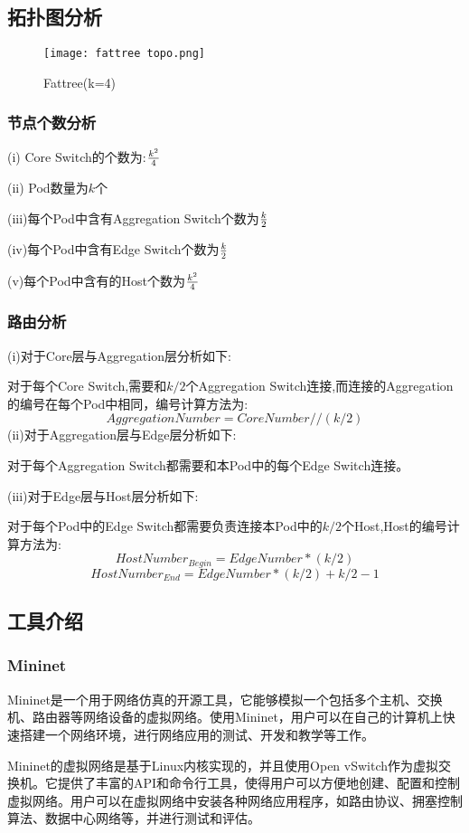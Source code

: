 \documentclass{xjtureport}
\begin{document}
\subsection{拓扑图分析} 
\begin{figure}[H]
	\centering
	\texttt{[image: fattree topo.png]}
	\caption{Fattree(k=4)}
\end{figure}
\subsubsection{节点个数分析}
(i) Core Switch的个数为:$k^2 \over 4$\par
(ii) Pod数量为$k$个\par
(iii)每个Pod中含有Aggregation Switch个数为$k \over 2$\par
(iv)每个Pod中含有Edge Switch个数为$k \over 2$\par 
(v)每个Pod中含有的Host个数为$k^2 \over 4$
\subsubsection{路由分析}
(i)对于Core层与Aggregation层分析如下:\par
\quad \quad 对于每个Core Switch,需要和$k/2$个Aggregation Switch连接,而连接的Aggregation的编号在每个Pod中相同，编号计算方法为:
$$ AggregationNumber = CoreNumber // (k/2)$$
\quad \quad(ii)对于Aggregation层与Edge层分析如下:\par 
\quad \quad 对于每个Aggregation Switch都需要和本Pod中的每个Edge Switch连接。\par
(iii)对于Edge层与Host层分析如下:\par 
\quad \quad 对于每个Pod中的Edge Switch都需要负责连接本Pod中的$k/2$个Host,Host的编号计算方法为:
$$ HostNumber_{Begin} = EdgeNumber*(k/2) $$
$$ HostNumber_{End} = EdgeNumber*(k/2) + k/2 - 1$$
\subsection{工具介绍}
\subsubsection{Mininet}
Mininet是一个用于网络仿真的开源工具，它能够模拟一个包括多个主机、交换机、路由器等网络设备的虚拟网络。使用Mininet，用户可以在自己的计算机上快速搭建一个网络环境，进行网络应用的测试、开发和教学等工作。

Mininet的虚拟网络是基于Linux内核实现的，并且使用Open vSwitch作为虚拟交换机。它提供了丰富的API和命令行工具，使得用户可以方便地创建、配置和控制虚拟网络。用户可以在虚拟网络中安装各种网络应用程序，如路由协议、拥塞控制算法、数据中心网络等，并进行测试和评估。
\end{document}
